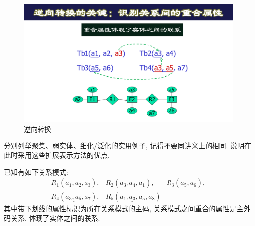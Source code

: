 \begin{figure}[H]
    \centering
    \includegraphics[width=.5\textwidth]{figure/逆向转换.pdf}
    \caption{逆向转换}
\end{figure}

\begin{problemset}
    \item 分别列举聚集、弱实体、细化/泛化的实用例子, 记得不要同讲义上的相同. 说明在此时采用这些扩展表示方法的优点.
    \item 已知有如下关系模式: 
  \begin{eqnarray*}
    R_1 \left( \text{} \underline{a_1}, a_2, a_3 \right), & R_2 \left(
    \underline{a_3}, a_4, a_1 \right), & R_3 \left( \underline{a_5}, a_6
    \right),\\
    R_4 \left( \underline{a_3, a_5}, a_7 \right), & R_5 \left( \underline{a_1,
    a_3, a_5}, a_8 \right) & 
  \end{eqnarray*}
  其中带下划线的属性标识为所在关系模式的主码, 关系模式之间重合的属性是主外码关系, 体现了实体之间的联系.
  

\end{problemset}
